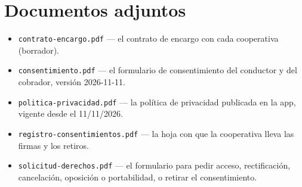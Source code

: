 \documentclass[10.5pt,a4paper]{article}
\begin{document}
\section{Documentos adjuntos}
\begin{itemize}[leftmargin=14pt,itemsep=0pt]
\item \texttt{contrato-encargo.pdf} — el contrato de encargo con cada cooperativa (borrador).
\item \texttt{consentimiento.pdf} — el formulario de consentimiento del conductor y del cobrador, versión 2026-11-11.
\item \texttt{politica-privacidad.pdf} — la política de privacidad publicada en la app, vigente desde el 11/11/2026.
\item \texttt{registro-consentimientos.pdf} — la hoja con que la cooperativa lleva las firmas y los retiros.
\item \texttt{solicitud-derechos.pdf} — el formulario para pedir acceso, rectificación, cancelación, oposición o portabilidad, o retirar el consentimiento.
\end{itemize}
\end{document}
